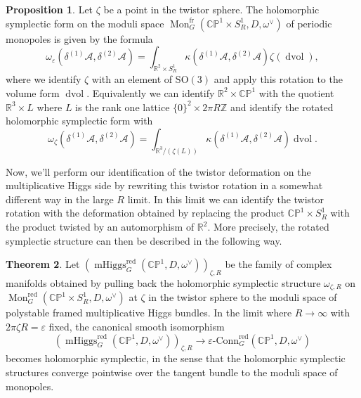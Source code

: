 \documentclass[11pt, oneside, reqno]{amsart}
\theoremstyle{definition} \newtheorem{definition}{Definition}[section]
\newtheorem{theorem}[definition]{Theorem}
\newtheorem{prop}[definition]{Proposition}
\theoremstyle{definition} \newtheorem{remark}[definition]{Remark}
\theoremstyle{definition} \newtheorem{remarks}[definition]{Remarks}
\theoremstyle{definition} \newtheorem{question}[definition]{Question}
\theoremstyle{definition} \newtheorem*{note}{Note}
\theoremstyle{definition} \newtheorem{example}[definition]{Example}
\theoremstyle{definition} \newtheorem{examples}[definition]{Examples}
\newcommand{\bb}[1]{\mathbb{#1}}
\newcommand{\mr}[1]{\mathrm{#1}}
\newcommand{\mc}[1]{\mathcal{#1}}
\newcommand{\RR}{\mathbb{R}}
\newcommand{\ZZ}{\mathbb{Z}}
\newcommand{\eps}{\varepsilon}
\newcommand{\SO}{\mathrm{SO}}
\DeclareMathOperator{\dvol}{dvol}
\DeclareMathOperator{\mhiggs}{mHiggs}
\DeclareMathOperator{\mon}{Mon}
\newcommand{\epsconn}{\varepsilon\text{-Conn}}
\newcommand{\fr}{\mathrm{fr}}
\begin{document}
\begin{prop}
Let $\zeta$ be a point in the twistor sphere.  The holomorphic symplectic form on the moduli space $\mon_G^{\fr}(\bb{CP}^1 \times S^1_R, D, \omega^\vee)$ of periodic monopoles is given by the formula 
\[\omega_\eps(\delta^{(1)}\mc A, \delta^{(2)}\mc A) = \int_{\RR^2 \times S^1_R} \kappa(\delta^{(1)} \mc A, \delta^{(2)} \mc A) \zeta(\dvol),\]
where we identify $\zeta$ with an element of $\SO(3)$ and apply this rotation to the volume form $\dvol$.  Equivalently we can identify $\RR^2 \times \bb{CP}^1$ with the quotient $\RR^3 \times L$ where $L$ is the rank one lattice $\{0\}^2 \times 2\pi R\ZZ$ and identify the rotated holomorphic symplectic form with 
\[\omega_\zeta(\delta^{(1)}\mc A, \delta^{(2)}\mc A) = \int_{\RR^3/(\zeta(L))} \kappa(\delta^{(1)} \mc A, \delta^{(2)} \mc A) \dvol.\]
\end{prop}

Now, we'll perform our identification of the twistor deformation on the multiplicative Higgs side by rewriting this twistor rotation in a somewhat different way in the large $R$ limit.  In this limit we can identify the twistor rotation with the deformation obtained by replacing the product $\bb{CP}^1 \times S^1_R$ with the product twisted by an automorphism of $\RR^2$.  More precisely, the rotated symplectic structure can then be described in the following way.

\begin{theorem} \label{HK_rotation_thm}
Let $\left(\mhiggs^{\text{red}}_G(\bb{CP}^1,D,\omega^\vee)\right)_{\zeta,R}$ be the family of complex manifolds obtained by pulling back the holomorphic symplectic structure $\omega_{\zeta,R}$ on $\mon_G^{\mr{red}}(\bb{CP}^1 \times S^1_R,D,\omega^\vee)$ at $\zeta$ in the twistor sphere to the moduli space of polystable framed multiplicative Higgs bundles.  In the limit where $R \to \infty$ with $2 \pi \zeta R = \eps$ fixed, the canonical smooth isomorphism
\[\left(\mhiggs^{\text{red}}_G(\bb{CP}^1,D,\omega^\vee)\right)_{\zeta,R} \to \epsconn^{\text{red}}_G(\bb{CP}^1,D,\omega^\vee)\]
becomes holomorphic symplectic, in the sense that the holomorphic symplectic structures converge pointwise over the tangent bundle to the moduli space of monopoles. 
\end{theorem}
\end{document}
